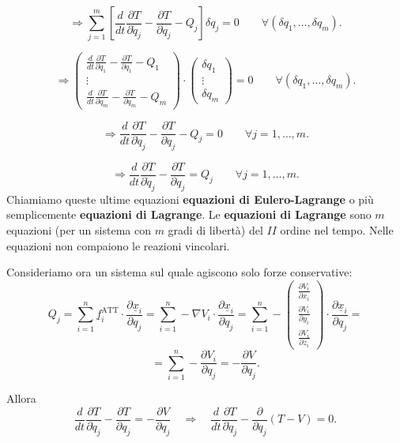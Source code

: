 \[
\Rightarrow \sum_{j=1}^{m}
\left[
\frac{d}{dt}
\frac{\partial T}{\partial \dot{q}_j}
-
\frac{\partial T}{\partial q_j}
-
Q_j
\right]\delta q_j
=
0
\qquad
\forall (\delta q_1,\ldots,\delta q_m).
\]

\[
\Rightarrow \begin{pmatrix}
\frac{d}{dt}\frac{\partial T}{\partial \dot{q}_1}
-
\frac{\partial T}{\partial q_1}
-
Q_1
\\
\vdots
\\
\frac{d}{dt}\frac{\partial T}{\partial \dot{q}_m}
-
\frac{\partial T}{\partial q_m}
-
Q_m
\end{pmatrix}
\cdot
\begin{pmatrix}
\delta q_1
\\
\vdots
\\
\delta q_m
\end{pmatrix}
=
0
\qquad
\forall (\delta q_1,\ldots,\delta q_m).
\]

\[
\Rightarrow \frac{d}{dt}
\frac{\partial T}{\partial \dot{q}_j}
-
\frac{\partial T}{\partial q_j}
-
Q_j
=
0
\qquad
\forall j = 1,\ldots,m.
\]

\[
\Rightarrow \frac{d}{dt}
\frac{\partial T}{\partial \dot{q}_j}
-
\frac{\partial T}{\partial q_j}
=
Q_j
\qquad
\forall j = 1,\ldots,m.
\]
Chiamiamo queste ultime equazioni \textbf{equazioni di Eulero-Lagrange} o più semplicemente \textbf{equazioni di Lagrange}. Le \textbf{equazioni di Lagrange} sono $m$ equazioni (per un sistema con $m$ gradi di libertà) del $II$ ordine nel tempo. Nelle equazioni non compaiono le reazioni vincolari.

Consideriamo ora un sistema sul quale agiscono solo forze conservative:
\[
Q_j
=
\sum_{i=1}^{n}
\underline{f}_i^{\mathrm{ATT}}
\cdot
\frac{\partial \underline{x}_i}{\partial q_j}
=
\sum_{i=1}^{n}
-\nabla V_i
\cdot
\frac{\partial \underline{x}_i}{\partial q_j}
=
\sum_{i=1}^{n}
-
\begin{pmatrix}
\frac{\partial V_i}{\partial x_i}
\\[2pt]
\frac{\partial V_i}{\partial y_i}
\\[2pt]
\frac{\partial V_i}{\partial z_i}
\end{pmatrix}
\cdot
\frac{\partial \underline{x}_i}{\partial q_j}
=
\]
\[
=
\sum_{i=1}^{n}
-
\frac{\partial V_i}{\partial q_j}
=
-
\frac{\partial V}{\partial q_j}.
\]

Allora
\[
\frac{d}{dt}
\frac{\partial T}{\partial \dot{q}_j}
-
\frac{\partial T}{\partial q_j}
=
-
\frac{\partial V}{\partial q_j}
\quad \Longrightarrow \quad
\frac{d}{dt}
\frac{\partial T}{\partial \dot{q}_j}
-
\frac{\partial}{\partial q_j}
(T - V)
=
0.
\]

